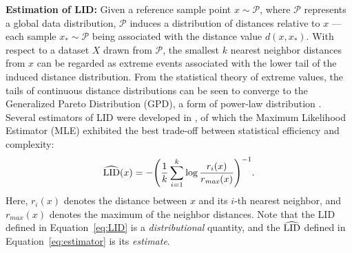 \documentclass{article}
\begin{document}
\textbf{Estimation of LID:}
Given a reference sample point $x \sim \mathcal{P}$, where $\mathcal{P}$ represents a global data distribution, $\mathcal{P}$ induces a distribution of distances relative to $x$ --- each sample $x_{*}\sim \mathcal{P}$ being associated with the distance value $d(x,x_{*})$. With respect to a dataset $X$ drawn from $\mathcal{P}$, the smallest $k$ nearest neighbor distances from $x$ can be regarded as extreme events associated with the lower tail of the induced distance distribution. From the statistical theory of extreme values, the tails of continuous distance distributions can be seen to converge to the Generalized Pareto Distribution (GPD), a form of power-law distribution \cite{coles2001introduction,hill1975simple}.
Several estimators of LID were developed in \cite{amsaleg2015estimating,levina2005maximum}, of which the Maximum Likelihood Estimator (MLE) exhibited the best trade-off between statistical efficiency and complexity:
\begin{equation} \label{eq:estimator}
\widehat{\textup{LID}}(x) = - \Bigg( \frac{1}{k}\sum_{i=1}^{k}\log \frac{r_i(x)}{r_{\mathit{max}}(x)}\Bigg)^{-1}.
\end{equation}
\noindent Here, $r_i(x)$ denotes the distance between $x$ and its $i$-th nearest neighbor, and $r_{\mathit{max}}(x)$ denotes the maximum of the neighbor distances. Note that the LID defined in Equation~\eqref{eq:LID} is a \textit{distributional} quantity, and the $\widehat{\textup{LID}}$ defined in Equation~\eqref{eq:estimator} is its \textit{estimate}.
\end{document}
